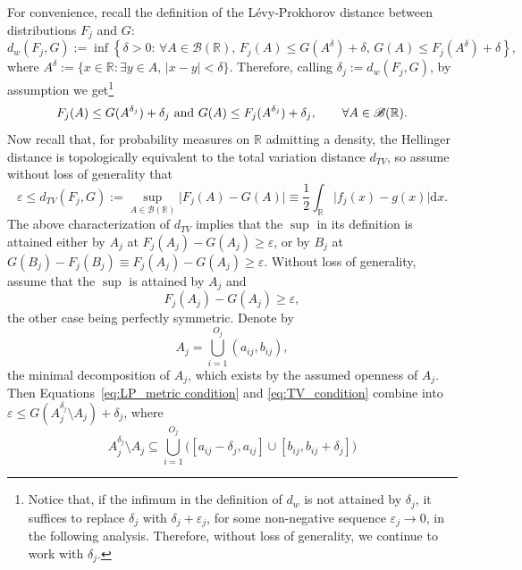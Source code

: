 \documentclass[11pt,twoside]{article}
\def\RR{\mathbb{R}}
\begin{document}
For convenience, recall the definition of the Lévy-Prokhorov distance between distributions $F_j$ and $G$:
%
\begin{equation*}
    d_w(F_j, G) := \inf\left\{\delta>0:\, \forall A\in\mathscr B(\RR),\, F_j(A)\leq G(A^\delta) +\delta, \, G(A)\leq F_j(A^\delta)+\delta\right\},
\end{equation*}
%
where $A^\delta := \{x\in\RR : \exists y\in A, \, \vert x-y\vert < \delta\}$. Therefore, calling $\delta_j:= d_w(F_j, G)$, by assumption we get\footnote{Notice that, if the infimum in the definition of $d_w$ is not attained by $\delta_j$, it suffices to replace $\delta_j$ with $\delta_j + \varepsilon_j$, for some non-negative sequence $\varepsilon_j \to 0$, in the following analysis. Therefore, without loss of generality, we continue to work with $\delta_j$.}
%
\begin{equation}\label{eq:LP_metric condition}
    F_j(A) \leq G(A^{\delta_j}) + \delta_j \textnormal{ and } G(A) \leq F_j(A^{\delta_j}) + \delta_j, \qquad \forall A\in\mathscr B(\RR).
\end{equation}
%
Now recall that, for probability measures on $\RR$ admitting a density, the Hellinger distance is topologically equivalent to the total variation distance $d_{TV}$, so assume without loss of generality that
%
\begin{equation*}
    \varepsilon \leq d_{TV}(F_j, G) := \sup_{A\in\mathscr B(\RR)} \vert F_j(A) - G(A)\vert \equiv \frac{1}{2}\int_\RR \vert f_j(x) - g(x) \vert \mathrm dx.
\end{equation*}
%
The above characterization of $d_{TV}$ implies that the $\sup$ in its definition is attained either by $A_j$ at $F_j(A_j) - G(A_j)\geq\varepsilon$, or by $B_j$ at $G(B_j) - F_j(B_j)\equiv F_j(A_j) - G(A_j) \geq\varepsilon$. Without loss of generality, assume that the $\sup$ is attained by $A_j$ and
%
\begin{equation}\label{eq:TV_condition}
    F_j(A_j) - G(A_j)\geq\varepsilon,
\end{equation}
%
the other case being perfectly symmetric. Denote by
%
\begin{equation*}
    A_j = \bigcup_{i=1}^{O_j} (a_{ij}, b_{ij}),
\end{equation*}
%
the minimal decomposition of $A_j$, which exists by the assumed openness of $A_j$. Then Equations~\eqref{eq:LP_metric condition} and \eqref{eq:TV_condition} combine into $   \varepsilon \leq G(A_j^{\delta_j}\setminus A_j) + \delta_j$, where
%
\begin{equation*}
    A_j^{\delta_j}\setminus A_j \subseteq \bigcup_{i=1}^{O_j}\Big([a_{ij} - \delta_j, a_{ij}]\cup [b_{ij}, b_{ij} + \delta_j]\Big)
\end{equation*}
\end{document}
